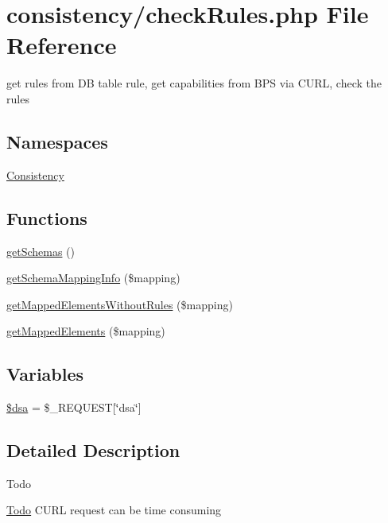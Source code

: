 \hypertarget{check_rules_8php}{}\section{consistency/check\+Rules.php File Reference}
\label{check_rules_8php}


get rules from DB table rule, get capabilities from B\+PS via C\+U\+RL, check the rules  


\subsection*{Namespaces}
\begin{DoxyCompactItemize}
\item 
 \hyperlink{namespace_consistency}{Consistency}
\end{DoxyCompactItemize}
\subsection*{Functions}
\begin{DoxyCompactItemize}
\item 
\hyperlink{namespace_consistency_ac3ce77dc252c4606ec6b0378f5d79ac7}{get\+Schemas} ()
\item 
\hyperlink{namespace_consistency_a9bf0ee2da6d3a74ee9dbfcf73ae9842e}{get\+Schema\+Mapping\+Info} (\$mapping)
\item 
\hyperlink{namespace_consistency_a2be2339d3806b3febbdb87bd1c27e603}{get\+Mapped\+Elements\+Without\+Rules} (\$mapping)
\item 
\hyperlink{namespace_consistency_a489e7863dc1879d02c46deb03793bc03}{get\+Mapped\+Elements} (\$mapping)
\end{DoxyCompactItemize}
\subsection*{Variables}
\begin{DoxyCompactItemize}
\item 
\hyperlink{namespace_consistency_aca6ad28ee812df74bbd827a9d244055e}{\$dsa} = \$\+\_\+\+R\+E\+Q\+U\+E\+ST\mbox{[}\char`\"{}dsa\char`\"{}\mbox{]}
\end{DoxyCompactItemize}


\subsection{Detailed Description}
\begin{DoxyRefDesc}{Todo}
\item[\hyperlink{todo__todo000003}{Todo}]C\+U\+RL request can be time consuming\end{DoxyRefDesc}



